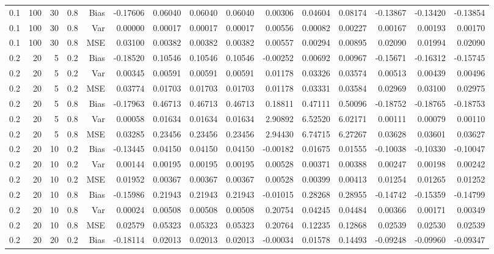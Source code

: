 \begin{table}[!htbp]
\begin{tabular}{lrrrrrrrrrrrrrr}
0.1 & 100 & 30 & 0.8 & Bias & -0.17606 & 0.06040 & 0.06040 & 0.06040 & 0.00306 & 0.04604 & 0.08174 & -0.13867 & -0.13420 & -0.13854 \\
0.1 & 100 & 30 & 0.8 & Var & 0.00000 & 0.00017 & 0.00017 & 0.00017 & 0.00556 & 0.00082 & 0.00227 & 0.00167 & 0.00193 & 0.00170 \\
0.1 & 100 & 30 & 0.8 & MSE & 0.03100 & 0.00382 & 0.00382 & 0.00382 & 0.00557 & 0.00294 & 0.00895 & 0.02090 & 0.01994 & 0.02090 \\
0.2 &  20 &  5 & 0.2 & Bias & -0.18520 & 0.10546 & 0.10546 & 0.10546 & -0.00252 & 0.00692 & 0.00967 & -0.15671 & -0.16312 & -0.15745 \\
0.2 &  20 &  5 & 0.2 & Var & 0.00345 & 0.00591 & 0.00591 & 0.00591 & 0.01178 & 0.03326 & 0.03574 & 0.00513 & 0.00439 & 0.00496 \\
0.2 &  20 &  5 & 0.2 & MSE & 0.03774 & 0.01703 & 0.01703 & 0.01703 & 0.01178 & 0.03331 & 0.03584 & 0.02969 & 0.03100 & 0.02975 \\
0.2 &  20 &  5 & 0.8 & Bias & -0.17963 & 0.46713 & 0.46713 & 0.46713 & 0.18811 & 0.47111 & 0.50096 & -0.18752 & -0.18765 & -0.18753 \\
0.2 &  20 &  5 & 0.8 & Var & 0.00058 & 0.01634 & 0.01634 & 0.01634 & 2.90892 & 6.52520 & 6.02171 & 0.00111 & 0.00079 & 0.00110 \\
0.2 &  20 &  5 & 0.8 & MSE & 0.03285 & 0.23456 & 0.23456 & 0.23456 & 2.94430 & 6.74715 & 6.27267 & 0.03628 & 0.03601 & 0.03627 \\
0.2 &  20 & 10 & 0.2 & Bias & -0.13445 & 0.04150 & 0.04150 & 0.04150 & -0.00182 & 0.01675 & 0.01555 & -0.10038 & -0.10330 & -0.10047 \\
0.2 &  20 & 10 & 0.2 & Var & 0.00144 & 0.00195 & 0.00195 & 0.00195 & 0.00528 & 0.00371 & 0.00388 & 0.00247 & 0.00198 & 0.00242 \\
0.2 &  20 & 10 & 0.2 & MSE & 0.01952 & 0.00367 & 0.00367 & 0.00367 & 0.00528 & 0.00399 & 0.00413 & 0.01254 & 0.01265 & 0.01252 \\
0.2 &  20 & 10 & 0.8 & Bias & -0.15986 & 0.21943 & 0.21943 & 0.21943 & -0.01015 & 0.28268 & 0.28955 & -0.14742 & -0.15359 & -0.14799 \\
0.2 &  20 & 10 & 0.8 & Var & 0.00024 & 0.00508 & 0.00508 & 0.00508 & 0.20754 & 0.04245 & 0.04484 & 0.00366 & 0.00171 & 0.00349 \\
0.2 &  20 & 10 & 0.8 & MSE & 0.02579 & 0.05323 & 0.05323 & 0.05323 & 0.20764 & 0.12235 & 0.12868 & 0.02539 & 0.02530 & 0.02539 \\
0.2 &  20 & 20 & 0.2 & Bias & -0.18114 & 0.02013 & 0.02013 & 0.02013 & -0.00034 & 0.01578 & 0.14493 & -0.09248 & -0.09960 & -0.09347 \\

\end{tabular}
\end{table}

